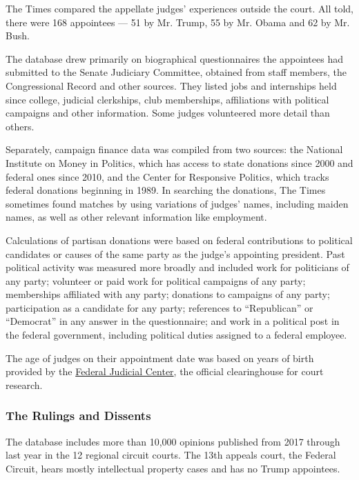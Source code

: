 The Times compared the appellate judges' experiences outside the court.
All told, there were 168 appointees --- 51 by Mr. Trump, 55 by Mr. Obama
and 62 by Mr. Bush.

The database drew primarily on biographical questionnaires the
appointees had submitted to the Senate Judiciary Committee, obtained
from staff members, the Congressional Record and other sources. They
listed jobs and internships held since college, judicial clerkships,
club memberships, affiliations with political campaigns and other
information. Some judges volunteered more detail than others.

Separately, campaign finance data was compiled from two sources: the
National Institute on Money in Politics, which has access to state
donations since 2000 and federal ones since 2010, and the Center for
Responsive Politics, which tracks federal donations beginning in 1989.
In searching the donations, The Times sometimes found matches by using
variations of judges' names, including maiden names, as well as other
relevant information like employment.

Calculations of partisan donations were based on federal contributions
to political candidates or causes of the same party as the judge's
appointing president. Past political activity was measured more broadly
and included work for politicians of any party; volunteer or paid work
for political campaigns of any party; memberships affiliated with any
party; donations to campaigns of any party; participation as a candidate
for any party; references to ``Republican'' or ``Democrat'' in any
answer in the questionnaire; and work in a political post in the federal
government, including political duties assigned to a federal employee.

The age of judges on their appointment date was based on years of birth
provided by the \href{https://www.fjc.gov/history/judges}{Federal
Judicial Center}, the official clearinghouse for court research.

\hypertarget{the-rulings-and-dissents}{%
\subsubsection{The Rulings and
Dissents}\label{the-rulings-and-dissents}}

The database includes more than 10,000 opinions published from 2017
through last year in the 12 regional circuit courts. The 13th appeals
court, the Federal Circuit, hears mostly intellectual property cases and
has no Trump appointees.

